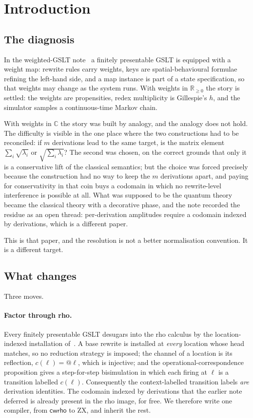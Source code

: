 \documentclass[11pt]{article}
\theoremstyle{definition}
\theoremstyle{plain}
\newcommand{\cwrho}{\textsf{cwrho}}
\begin{document}
\tableofcontents

\section{Introduction}\label{sec:intro}

\subsection{The diagnosis}

In the weighted-GSLT note~\cite{weighted} a finitely presentable GSLT is equipped with a
weight map: rewrite rules carry weights, keys are spatial-behavioural formulae refining the
left-hand side, and a map instance is part of a state specification, so that weights may
change as the system runs. With weights in $\mathbb{R}_{\geq 0}$ the story is settled: the
weights are propensities, redex multiplicity is Gillespie's $h$, and the simulator samples a
continuous-time Markov chain.

With weights in $\mathbb{C}$ the story was built by analogy, and the analogy does not hold.
The difficulty is visible in the one place where the two constructions had to be reconciled:
if $m$ derivations lead to the same target, is the matrix element $\sum_i \sqrt{\lambda_i}$
or $\sqrt{\sum_i \lambda_i}$? The second was chosen, on the correct grounds that only it is a
conservative lift of the classical semantics; but the choice was forced precisely because the
construction had no way to keep the $m$ derivations apart, and paying for conservativity in
that coin buys a codomain in which no rewrite-level interference is possible at all. What was
supposed to be the quantum theory became the classical theory with a decorative phase, and
the note recorded the residue as an open thread: per-derivation amplitudes require a codomain
indexed by derivations, which is a different paper.

This is that paper, and the resolution is not a better normalisation convention. It is a
different target.

\subsection{What changes}

Three moves.

\paragraph{Factor through rho.} Every finitely presentable GSLT desugars into the rho
calculus by the location-indexed installation of~\cite[\S4.2, App.~A]{knotted}. A base rewrite
is installed at \emph{every} location whose head matches, so no reduction strategy is imposed;
the channel of a location is its reflection, $c(\ell) = @\ell$, which is injective; and
the operational-correspondence proposition gives a step-for-step bisimulation in which each
firing at $\ell$ is a transition labelled $c(\ell)$. Consequently the context-labelled
transition labels \emph{are} derivation identities. The codomain indexed by derivations that
the earlier note deferred is already present in the rho image, for free. We therefore write one
compiler, from $\cwrho$ to ZX, and inherit the rest.
\end{document}
